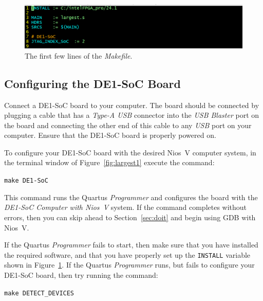 \documentclass[11pt, twoside, pdftex]{article}
\begin{document}
{\begin{figure}[h]
    \begin{center}
        \includegraphics[scale=.5]{figures/firstfew.png}
        \caption{The first few lines of the {\it Makefile}.}
        \label{fig:firstfew}
    \end{center}
\end{figure}

\subsection{Configuring the DE1-SoC Board}

Connect a DE1-SoC board to your computer. The board should be connected by plugging
a cable that has a {\it Type-A USB} connector into the {\it USB Blaster} port on the board 
and connecting the other end of this cable to any {\it USB} port on your computer. Ensure 
that the DE1-SoC board is properly powered on.

To configure your DE1-SoC board with the desired Nios~V computer system, in the terminal
window of Figure~\ref{fig:largest1} execute the command:

\texttt{make DE1-SoC} 

This command runs the Quartus {\it Programmer} and configures the board with the 
{\it DE1-SoC Computer with Nios~V} system. If the command completes without errors, then you 
can skip ahead to Section~\ref{sec:doit} and begin using GDB with Nios~V. 

If the Quartus {\it Programmer} fails to start, then make sure that you have installed the
required software, and that you have properly set up the \texttt{INSTALL} variable shown
in Figure~\ref{fig:firstfew}. If the Quartus {\it Programmer} runs, but fails to configure 
your DE1-SoC board, then try running the command:

\texttt{make DETECT\_DEVICES}

}
\end{document}
